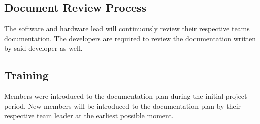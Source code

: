 

\subsection{Document Review Process}

The software and hardware lead will continuously review their respective teams documentation. The developers are required to review the documentation written by said developer as well.



\subsection{Training}

Members were introduced to the documentation plan during the initial project period. New members will be introduced to the documentation plan by their respective team leader at the earliest possible moment.




